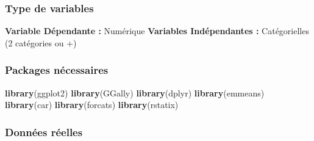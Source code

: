 \documentclass[
]{book}
\newenvironment{Shaded}{\begin{snugshade}}{\end{snugshade}}
\newcommand{\KeywordTok}[1]{\textcolor[rgb]{0.13,0.29,0.53}{\textbf{#1}}}
\newcommand{\NormalTok}[1]{#1}
\begin{document}
\hypertarget{type-de-variables-3}{%
\subsubsection{Type de variables}\label{type-de-variables-3}}

\textbf{Variable Dépendante :} Numérique
\textbf{Variables Indépendantes :} Catégorielles (2 catégories ou +)

\hypertarget{packages-nuxe9cessaires-3}{%
\subsubsection{Packages nécessaires}\label{packages-nuxe9cessaires-3}}

\begin{Shaded}
\begin{Highlighting}[]
\KeywordTok{library}\NormalTok{(ggplot2)}
\KeywordTok{library}\NormalTok{(GGally)}
\KeywordTok{library}\NormalTok{(dplyr)}
\KeywordTok{library}\NormalTok{(emmeans)}
\KeywordTok{library}\NormalTok{(car)}
\KeywordTok{library}\NormalTok{(forcats)}
\KeywordTok{library}\NormalTok{(rstatix)}
\end{Highlighting}
\end{Shaded}

\hypertarget{donnuxe9es-ruxe9elles-3}{%
\subsubsection{Données réelles}\label{donnuxe9es-ruxe9elles-3}}
\end{document}
